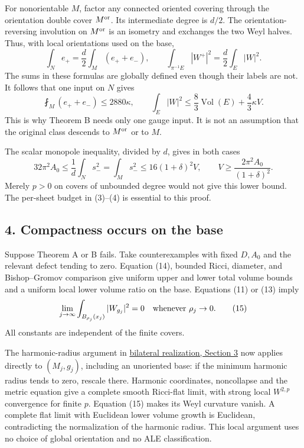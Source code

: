 \documentclass[
  11pt,
]{article}
\begin{document}
For nonorientable \(M\), factor any connected oriented covering through
the orientation double cover \(M^{\rm or}\). Its intermediate degree is
\(d/2\). The orientation-reversing involution on \(M^{\rm or}\) is an
isometry and exchanges the two Weyl halves. Thus, with local
orientations used on the base, \[
 \int_N e_+=\frac d2\int_M(e_++e_-),\qquad
 \int_{\pi^{-1}E}|W^+|^2=\frac d2\int_E|W|^2.
 \tag{12}
\] The sums in these formulas are globally defined even though their
labels are not. It follows that one input on \(N\) gives \[
 \fint_M(e_++e_-)\le2880\kappa,\qquad
 \int_E|W|^2\le\frac83\operatorname{Vol}(E)+\frac43\kappa V.
 \tag{13}
\] This is why Theorem B needs only one gauge input. It is not an
assumption that the original class descends to \(M^{\rm or}\) or to
\(M\).

The scalar monopole inequality, divided by \(d\), gives in both cases \[
 32\pi^2A_0\le\frac1d\int_Ns_-^2
                  =\int_Ms_-^2\le16(1+\delta)^2V,
 \qquad V\ge\frac{2\pi^2A_0}{(1+\delta)^2}.
 \tag{14}
\] Merely \(p>0\) on covers of unbounded degree would not give this
lower bound. The per-sheet budget in (3)--(4) is essential to this
proof.

\hypertarget{compactness-occurs-on-the-base}{%
\subsection{4. Compactness occurs on the
base}\label{compactness-occurs-on-the-base}}

Suppose Theorem A or B fails. Take counterexamples with fixed \(D,A_0\)
and the relevant defect tending to zero. Equation (14), bounded Ricci,
diameter, and Bishop--Gromov comparison give uniform upper and lower
total volume bounds and a uniform local lower volume ratio on the base.
Equations (11) or (13) imply \[
 \lim_{j\to\infty}\int_{B_{\rho_j}(x_j)}|W_{g_j}|^2=0
                         \quad\hbox{whenever }\rho_j\to0.
 \tag{15}
\] All constants are independent of the finite covers.

The harmonic-radius argument in
\href{20260924_bilateral_realization.md}{bilateral realization, Section
3} now applies directly to \((M_j,g_j)\), including an unoriented base:
if the minimum harmonic radius tends to zero, rescale there. Harmonic
coordinates, noncollapse and the metric equation give a complete smooth
Ricci-flat limit, with strong local \(W^{2,p}\) convergence for finite
\(p\). Equation (15) makes its Weyl curvature vanish. A complete flat
limit with Euclidean lower volume growth is Euclidean, contradicting the
normalization of the harmonic radius. This local argument uses no choice
of global orientation and no ALE classification.
\end{document}
